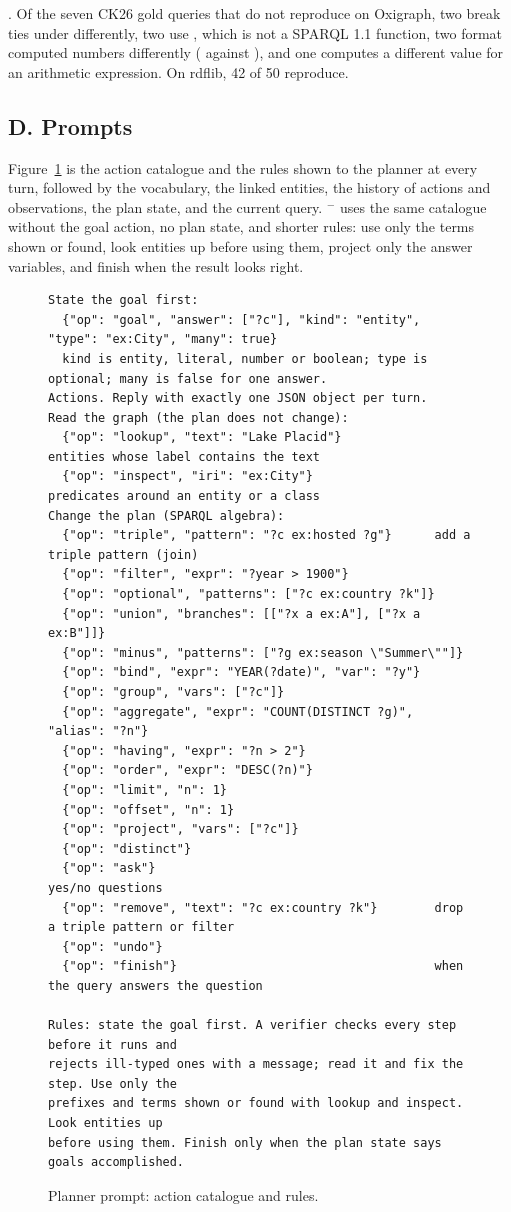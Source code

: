 .
Of the seven CK26 gold queries that do not reproduce on Oxigraph, two
break ties under  differently, two use , which
is not a SPARQL 1.1 function, two format computed numbers differently
(\eg {} against ), and one computes a different value for
an arithmetic expression.
On rdflib, 42 of 50 reproduce.

\subsection*{D. Prompts}

Figure~\ref{fig-prompt} is the action catalogue and the rules shown to
the planner at every turn, followed by the vocabulary, the linked
entities, the history of actions and observations, the plan state, and
the current query.
\hermes{}$^-$ uses the same catalogue without the goal action, no plan
state, and shorter rules: use only the terms shown or found, look
entities up before using them, project only the answer variables, and
finish when the result looks right.

\begin{figure}[t]
\scriptsize
\begin{verbatim}
State the goal first:
  {"op": "goal", "answer": ["?c"], "kind": "entity", "type": "ex:City", "many": true}
  kind is entity, literal, number or boolean; type is optional; many is false for one answer.
Actions. Reply with exactly one JSON object per turn.
Read the graph (the plan does not change):
  {"op": "lookup", "text": "Lake Placid"}             entities whose label contains the text
  {"op": "inspect", "iri": "ex:City"}                 predicates around an entity or a class
Change the plan (SPARQL algebra):
  {"op": "triple", "pattern": "?c ex:hosted ?g"}      add a triple pattern (join)
  {"op": "filter", "expr": "?year > 1900"}
  {"op": "optional", "patterns": ["?c ex:country ?k"]}
  {"op": "union", "branches": [["?x a ex:A"], ["?x a ex:B"]]}
  {"op": "minus", "patterns": ["?g ex:season \"Summer\""]}
  {"op": "bind", "expr": "YEAR(?date)", "var": "?y"}
  {"op": "group", "vars": ["?c"]}
  {"op": "aggregate", "expr": "COUNT(DISTINCT ?g)", "alias": "?n"}
  {"op": "having", "expr": "?n > 2"}
  {"op": "order", "expr": "DESC(?n)"}
  {"op": "limit", "n": 1}
  {"op": "offset", "n": 1}
  {"op": "project", "vars": ["?c"]}
  {"op": "distinct"}
  {"op": "ask"}                                       yes/no questions
  {"op": "remove", "text": "?c ex:country ?k"}        drop a triple pattern or filter
  {"op": "undo"}
  {"op": "finish"}                                    when the query answers the question

Rules: state the goal first. A verifier checks every step before it runs and
rejects ill-typed ones with a message; read it and fix the step. Use only the
prefixes and terms shown or found with lookup and inspect. Look entities up
before using them. Finish only when the plan state says goals accomplished.
\end{verbatim}
\caption{Planner prompt: action catalogue and rules.}
\label{fig-prompt}
\end{figure}
